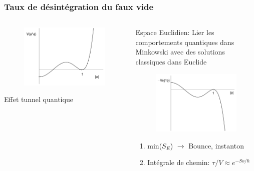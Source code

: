 \documentclass[handout]{beamer}
\begin{document}
\begin{frame}\frametitle{Taux de désintégration du faux vide}

\begin{columns}[T]
    \begin{column}[T]{.45\linewidth}
        \begin{figure}[.45\linewidth]
    \includegraphics[scale=0.2]{false1.png}
    \end{figure}
    Effet tunnel quantique

    \end{column}
    \begin{column}[T]{.45\linewidth}
   Espace Euclidien:  Lier les comportements quantiques dans Minkowski avec des solutions classiques dans Euclide
     \begin{figure}
    \includegraphics[scale=0.15]{false2.png}
    \end{figure}
  \begin{enumerate}
    \item  min($S_E$) $\rightarrow$ Bounce, instanton
    \item  Intégrale de chemin: $ \tau/V \approx e^{-So/\hbar}$ \\
   

\end{enumerate}
\end{column}
\end{columns}
\end{frame}
\end{document}
